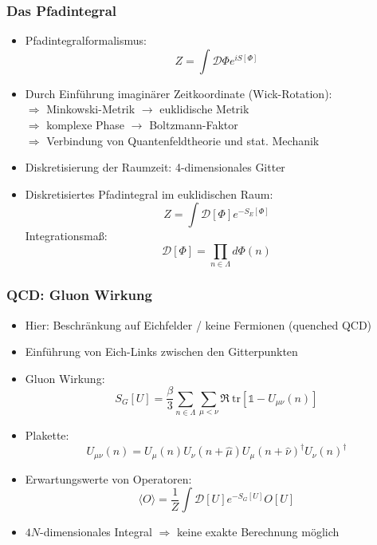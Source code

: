 \documentclass[10pt]{beamer}
\begin{document}
\begin{frame}
    \frametitle{Das Pfadintegral}
    \begin{itemize}
    	\item Pfadintegralformalismus:
    	\begin{equation}
			Z = \int \mathcal{D}\Phi e^{iS[\Phi]}
		\end{equation}
    	\item Durch Einführung imaginärer Zeitkoordinate (Wick-Rotation):\\
    	$\Rightarrow$ Minkowski-Metrik $\rightarrow$ euklidische Metrik\\
    	$\Rightarrow$ komplexe Phase $\rightarrow$ Boltzmann-Faktor\\
    	$\Rightarrow$ Verbindung von Quantenfeldtheorie und stat. Mechanik
    	\item Diskretisierung der Raumzeit: 4-dimensionales Gitter
        \item Diskretisiertes Pfadintegral im euklidischen Raum:
        \begin{equation}
			Z = \int \mathcal{D}[\Phi] e^{-S_E[\Phi]}
		\end{equation}
		Integrationsmaß:
		\begin{equation}
			\mathcal{D}[\Phi] = \prod_{n \in \Lambda} d\Phi(n)
		\end{equation}
    \end{itemize}
\end{frame}

\begin{frame}
    \frametitle{QCD: Gluon Wirkung}
    \begin{itemize}
    	\item Hier: Beschränkung auf Eichfelder / keine Fermionen (quenched QCD)
        \item Einführung von Eich-Links zwischen den Gitterpunkten
        \item Gluon Wirkung:
        \begin{equation}
\label{eq:plaq}
S_G[U] = \frac {\beta} 3 \sum_{n \in \Lambda} \sum_{\mu < \nu} \Re\ \text{tr} [\mathbb{1} - U_{\mu \nu}(n)]
\end{equation}
		\item Plakette:
		\begin{equation}
			U_{\mu \nu}(n) = U_{\mu}(n) U_{\nu}(n+\hat{\mu}) U_{\mu}(n+\hat{\nu})^{\dagger} U_{\nu}(n)^{\dagger}
		\end{equation}
		\item Erwartungswerte von Operatoren:
		\begin{equation}
			\langle O \rangle = \frac 1 Z \int \mathcal{D}[U] e^{-S_G[U]} O[U]
		\end{equation}
		\item $4N$-dimensionales Integral $\Rightarrow$ keine exakte Berechnung möglich
    \end{itemize}
\end{frame}
\end{document}
